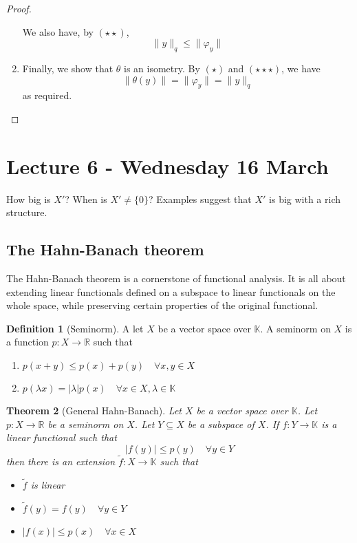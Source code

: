 \documentclass[10pt, reqno, oneside]{amsart}
\theoremstyle{plain}%
\newtheorem{thm}{Theorem}[section]
\theoremstyle{definition}
\newtheorem{defn}[thm]{Definition}
\theoremstyle{remark}
\newcommand{\R}{\mathbb{R}}
\newcommand{\K}{\mathbb{K}}
\renewcommand{\phi}{\varphi}
\begin{document}
\begin{proof}
\begin{enumerate}[(1)]
		We also have, by $(\star \star)$,\[
			\| y \|_q \leq \| \phi_y \|
		\] 
		\item Finally, we show that $\theta$ is an isometry.  By $(\star)$ and $(\star \star \star)$, we have \[
			\| \theta(y) \| = \| \phi_y \| = \| y \|_q 
		\] as required.\qedhere
		 
	\end{enumerate} 
\end{proof}	

\section{Lecture 6 - Wednesday 16 March} %
\label{sec:lecture_6_wednesday_16_march}
How big is $X'$?  When is $X' \neq \{ 0 \}$?  Examples suggest that $X'$ is big with a rich structure.  

\subsection{The Hahn-Banach theorem} %
\label{sub:the_hahn_banach_theorem}
The Hahn-Banach theorem is a cornerstone of functional analysis.  It is all about extending linear functionals defined on a subspace to linear functionals on the whole space, while preserving certain properties of the original functional.

\begin{defn}[Seminorm]
A let $X$ be a vector space over $\K$.  A seminorm on $X$ is a function $p : X \rightarrow \R$ such that 
\begin{enumerate}[(1)]
	\item $p(x+y) \leq p(x) + p(y) \quad \forall x,y \in X$
	\item $p(\lambda x) = | \lambda | p(x) \quad \forall x \in X, \lambda \in \K$
\end{enumerate}
\end{defn}

\begin{thm}[General Hahn-Banach]
	Let $X$ be a vector space over $\K$.  Let $p: X \rightarrow \R$ be a seminorm on $X$.  Let $Y \subseteq X$ be a subspace of $X$.  If $f : Y \rightarrow \K$ is a linear functional such that \[
		| f(y) | \leq p(y) \quad \forall y \in Y
	\] then there is an extension $\tilde{f} : X \rightarrow \K$ such that 
	\begin{itemize}
		\item $\tilde{f}$ is linear
		\item $\tilde f (y) = f(y) \quad \forall y \in Y$
		\item $|f(x)| \leq p(x) \quad \forall x \in X$
	\end{itemize}
\end{thm}
\end{document}
